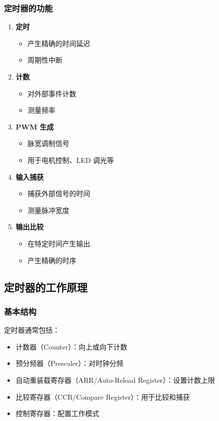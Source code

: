 \subsubsection{定时器的功能}

\begin{enumerate}
  \item \textbf{定时}
    \begin{itemize}
      \item 产生精确的时间延迟
      \item 周期性中断
    \end{itemize}

  \item \textbf{计数}
    \begin{itemize}
      \item 对外部事件计数
      \item 测量频率
    \end{itemize}

  \item \textbf{PWM 生成}
    \begin{itemize}
      \item 脉宽调制信号
      \item 用于电机控制、LED 调光等
    \end{itemize}

  \item \textbf{输入捕获}
    \begin{itemize}
      \item 捕获外部信号的时间
      \item 测量脉冲宽度
    \end{itemize}

  \item \textbf{输出比较}
    \begin{itemize}
      \item 在特定时间产生输出
      \item 产生精确的时序
    \end{itemize}
\end{enumerate}

\subsection{定时器的工作原理}

\subsubsection{基本结构}

定时器通常包括：
\begin{itemize}
  \item 计数器（Counter）：向上或向下计数
  \item 预分频器（Prescaler）：对时钟分频
  \item 自动重装载寄存器（ARR/Auto-Reload Register）：设置计数上限
  \item 比较寄存器（CCR/Compare Register）：用于比较和捕获
  \item 控制寄存器：配置工作模式
\end{itemize}

